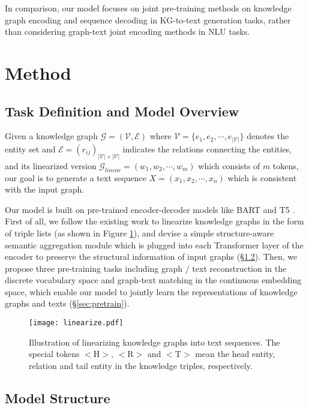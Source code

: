 \documentclass[11pt,a4paper]{article}
\begin{document}
In comparison, our model focuses on joint pre-training methods on knowledge graph encoding and sequence decoding in KG-to-text generation tasks, rather than considering graph-text joint encoding methods in NLU tasks.


\section{Method}

\subsection{Task Definition and Model Overview}

Given a knowledge graph $\mathcal{G}=(\mathcal{V}, \mathcal{E})$ where $\mathcal{V}=\{e_1,e_2,\cdots,e_{|\mathcal{V}|}\}$ denotes the entity set and $\mathcal{E}=(r_{ij})_{|\mathcal{V}|\times |\mathcal{V}|}$ indicates the relations connecting the entities, and its linearized version $\mathcal{G}_{linear}=(w_1,w_2,\cdots,w_m)$ which consists of $m$ tokens, our goal is to generate a text sequence $X=(x_1,x_2,\cdots,x_n)$ which is consistent with the input graph.

Our model is built on pre-trained encoder-decoder models like BART \cite{lewis2020bart} and T5 \cite{raffel2020t5}.
First of all, we follow the existing work \cite{chen2020kgpt} to linearize knowledge graphs in the form of triple lists (as shown in Figure \ref{fig:linearize}), and devise a simple structure-aware semantic aggregation module which is plugged into each Transformer layer of the encoder to preserve the structural information of input graphs (\S \ref{sec:encoder}). Then, we propose three pre-training tasks including graph / text reconstruction in the discrete vocabulary space and graph-text matching in the continuous embedding space,
which enable our model to jointly learn the representations of knowledge graphs and texts (\S \ref{sec:pretrain}).


\begin{figure}[!htp]
  \centering
  \texttt{[image: linearize.pdf]}\caption{Illustration of linearizing knowledge graphs into text sequences. The special tokens $<$H$>$, $<$R$>$ and $<$T$>$ mean the head entity, relation and tail entity in the knowledge triples, respectively.}
  \label{fig:linearize}
\end{figure}


\subsection{Model Structure}
\label{sec:encoder}
\end{document}
